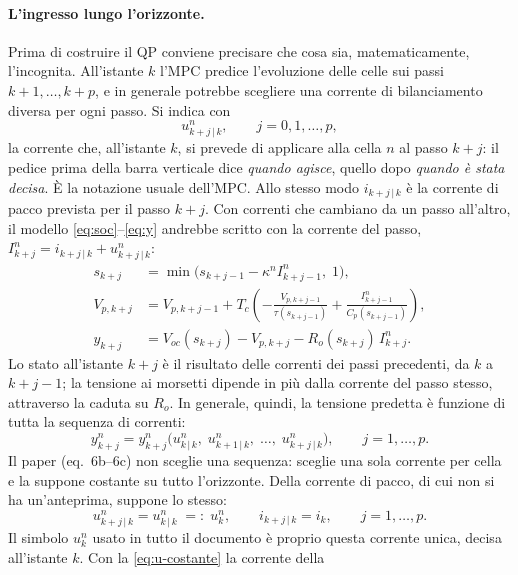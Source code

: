\documentclass[11pt,a4paper]{article}
\newcommand{\Tc}{T_c}
\begin{document}
\paragraph{L'ingresso lungo l'orizzonte.} Prima di costruire il QP conviene
precisare che cosa sia, matematicamente, l'incognita. All'istante $k$ l'MPC
predice l'evoluzione delle celle sui passi $k+1, \dots, k+p$, e in generale
potrebbe scegliere una corrente di bilanciamento diversa per ogni passo. Si
indica con
\[
  u^n_{k+j\,|\,k}, \qquad j = 0, 1, \dots, p ,
\]
la corrente che, all'istante $k$, si prevede di applicare alla cella $n$ al
passo $k+j$: il pedice prima della barra verticale dice \emph{quando agisce},
quello dopo \emph{quando è stata decisa}. È la notazione usuale dell'MPC. Allo
stesso modo $i_{k+j\,|\,k}$ è la corrente di pacco prevista per il passo
$k+j$. Con correnti che cambiano da un passo all'altro, il modello
\eqref{eq:soc}--\eqref{eq:y} andrebbe scritto con la corrente del passo,
$I^n_{k+j} = i_{k+j\,|\,k} + u^n_{k+j\,|\,k}$:
\begin{align*}
  s_{k+j} &= \min\bigl(s_{k+j-1} - \kappa^n I^n_{k+j-1},\; 1\bigr), \\
  V_{p,k+j} &= V_{p,k+j-1} + \Tc \left( -\frac{V_{p,k+j-1}}{\tau(s_{k+j-1})}
              + \frac{I^n_{k+j-1}}{C_p(s_{k+j-1})}\right), \\
  y_{k+j} &= V_{oc}(s_{k+j}) - V_{p,k+j} - R_o(s_{k+j})\, I^n_{k+j} .
\end{align*}
Lo stato all'istante $k+j$ è il risultato delle correnti dei passi
precedenti, da $k$ a $k+j-1$; la tensione ai morsetti dipende in più dalla
corrente del passo stesso, attraverso la caduta su $R_o$. In generale,
quindi, la tensione predetta è funzione di tutta la sequenza di correnti:
\begin{equation}
  y^n_{k+j} = y^n_{k+j}\bigl(u^n_{k\,|\,k},\; u^n_{k+1\,|\,k},\; \dots,\;
              u^n_{k+j\,|\,k}\bigr),
  \qquad j = 1, \dots, p .
  \tag{U1}\label{eq:u-sequenza}
\end{equation}
Il paper (eq.~6b--6c) non sceglie una sequenza: sceglie una sola corrente per
cella e la suppone costante su tutto l'orizzonte. Della corrente di pacco, di
cui non si ha un'anteprima, suppone lo stesso:
\begin{equation}
  u^n_{k+j\,|\,k} = u^n_{k\,|\,k} \;=:\; u^n_k ,
  \qquad
  i_{k+j\,|\,k} = i_k ,
  \qquad j = 1, \dots, p .
  \tag{U2}\label{eq:u-costante}
\end{equation}
Il simbolo $u^n_k$ usato in tutto il documento è proprio questa corrente
unica, decisa all'istante $k$. Con la \eqref{eq:u-costante} la corrente della
\end{document}
